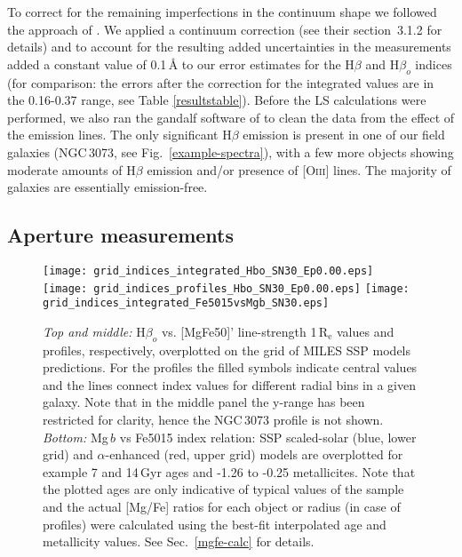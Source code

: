 \documentclass[useAMS,usenatbib]{mn2e}
\newcommand{\re}{$\mathrm{R_e}$}
\newcommand{\hb}{H$\beta$}
\newcommand{\hbo}{H$\beta_o$}
\newcommand{\mgb}{Mg\,$b$}
\begin{document}
To correct for the remaining imperfections in the continuum shape we followed the approach of \cite{kuntschner:2006}. We applied a continuum correction (see their section~3.1.2 for details) and to account for the resulting added uncertainties in the measurements added a constant value of 0.1\,{\AA} to our error estimates for the {\hb} and {\hbo} indices (for comparison: the errors after the correction for the integrated values are in the 0.16-0.37 range, see Table \ref{resultstable}). Before the LS calculations were performed, we also ran the {\sc gandalf} software of \cite{sarzi:2006} to clean the data from the effect of the emission lines. The only significant {\hb} emission is present in one of our field galaxies (NGC\,3073, see Fig.~\ref{example-spectra}), with a few more objects showing moderate amounts of {\hb} emission and/or presence of [O{\textsc{iii}}] lines. The majority of galaxies are essentially emission-free.

\subsection{Aperture measurements}

\begin{figure}
\begin{center}
\texttt{[image: grid\_indices\_integrated\_Hbo\_SN30\_Ep0.00.eps]}
\texttt{[image: grid\_indices\_profiles\_Hbo\_SN30\_Ep0.00.eps]}
\texttt{[image: grid\_indices\_integrated\_Fe5015vsMgb\_SN30.eps]}
\end{center}
\caption{\textit{Top and middle:} {\hbo} vs. [MgFe50]' line-strength 1\,{\re} values and profiles, respectively, overplotted on the grid of MILES SSP models predictions. For the profiles the filled symbols indicate central values and the lines connect index values for different radial bins in a given galaxy. Note that in the middle panel the y-range has been restricted for clarity, hence the NGC\,3073 profile is not shown. \textit{Bottom:} {\mgb} vs Fe5015 index relation: SSP scaled-solar (blue, lower grid) and $\alpha$-enhanced (red, upper grid) models are overplotted for example 7 and 14\,Gyr ages and -1.26 to -0.25 metallicites. Note that the plotted ages are only indicative of typical values of the sample and the actual [Mg/Fe] ratios for each object or radius (in case of profiles) were calculated using the best-fit interpolated age and metallicity values. See Sec.~\ref{mgfe-calc} for details.}
\label{grids}
\end{figure}
\end{document}
